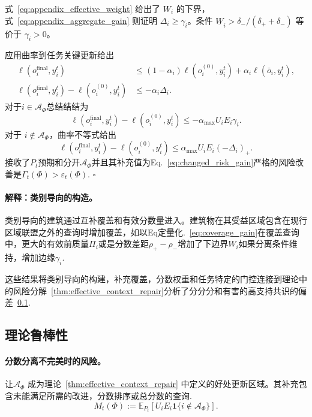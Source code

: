 式~\eqref{eq:appendix_effective_weight} 给出了 $W_i$ 的下界，式~\eqref{eq:appendix_aggregate_gain} 则证明 $\Delta_i\geq\gamma_i$。条件 $\underline W_i>\delta_-/(\delta_++\delta_-)$ 等价于 $\gamma_i>0$。

应用曲率到任务关键更新给出 \[
\begin{aligned}
\ell(o_i^{\mathrm{final}},y_i^t)
&\leq(1-\alpha_i)\ell(o_i^{(0)},y_i^t)
+\alpha_i\ell(\bar o_i,y_i^t),\\
\ell(o_i^{\mathrm{final}},y_i^t)-\ell(o_i^{(0)},y_i^t)
&\leq-\alpha_i\Delta_i.
\end{aligned}
\]对于$i\in\mathcal A_\Phi$总结结结为\[
\ell(o_i^{\mathrm{final}},y_i^t)-\ell(o_i^{(0)},y_i^t)
\leq-\alpha_{\max}U_iE_i\gamma_i.
\]
对于 $i\notin\mathcal A_\Phi$，曲率不等式给出
\[
\ell(o_i^{\mathrm{final}},y_i^t)-\ell(o_i^{(0)},y_i^t)
\leq\alpha_{\max}U_iE_i(-\Delta_i)_+.
\]接收了$P_t$预期和分开$\mathcal A_\Phi$并且其补充值为Eq.~\eqref{eq:changed_risk_gain}严格的风险改善是$\Gamma_t(\Phi)>\varepsilon_t(\Phi)$. \hfill$\square$

\paragraph{解释：类别导向的构造。}
\label{app:family-construction}

类别导向的建筑通过互补覆盖和有效分数量进入。建筑物在其受益区域包含在现行区域联盟之外的查询时增加覆盖，如以Eq定量化.~\eqref{eq:coverage_gain}在覆盖查询中，更大的有效前质量$\Pi_i$或是分数差距$\rho_+-\rho_-$增加了下边界$W_i$如果分离条件维持，增加边缘$\gamma_i$.

这些结果将类别导向的构建，补充覆盖，分数权重和任务特定的门控连接到理论中的风险分解~\ref{thm:effective_context_repair}分析了分分分和有害的高支持共识的偏差~\ref{app:theoretical-robustness}.

\subsection{理论鲁棒性}
\label{app:theoretical-robustness}

\paragraph{分数分离不完美时的风险。}
\label{app:imperfect-separation}

让$\mathcal A_\Phi$ 成为理论~\ref{thm:effective_context_repair} 中定义的好处更新区域。其补充包含未能满足所需的改进，分数排序或总分数的查询.
\begin{equation}
M_t(\Phi)
:=\mathbb E_{P_t}\!\left[
U_iE_i\mathbf 1\{i\notin\mathcal A_\Phi\}\right].
\label{eq:misalignment_mass}
\end{equation}

